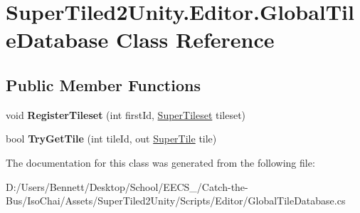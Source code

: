 \hypertarget{class_super_tiled2_unity_1_1_editor_1_1_global_tile_database}{}\section{Super\+Tiled2\+Unity.\+Editor.\+Global\+Tile\+Database Class Reference}
\label{class_super_tiled2_unity_1_1_editor_1_1_global_tile_database}
\subsection*{Public Member Functions}
\begin{DoxyCompactItemize}
\item 
\mbox{\label{class_super_tiled2_unity_1_1_editor_1_1_global_tile_database_a9709cf430d70af54b884610516715e5c}} 
void {\bfseries Register\+Tileset} (int first\+Id, \mbox{\hyperlink{class_super_tiled2_unity_1_1_editor_1_1_super_tileset}{Super\+Tileset}} tileset)
\item 
\mbox{\label{class_super_tiled2_unity_1_1_editor_1_1_global_tile_database_ad4ea11af14e9ca29d8c85dfc56661a48}} 
bool {\bfseries Try\+Get\+Tile} (int tile\+Id, out \mbox{\hyperlink{class_super_tiled2_unity_1_1_super_tile}{Super\+Tile}} tile)
\end{DoxyCompactItemize}


The documentation for this class was generated from the following file\+:\begin{DoxyCompactItemize}
\item 
D\+:/\+Users/\+Bennett/\+Desktop/\+School/\+E\+E\+C\+S\+\_/\+Catch-\/the-\/\+Bus/\+Iso\+Chai/\+Assets/\+Super\+Tiled2\+Unity/\+Scripts/\+Editor/Global\+Tile\+Database.\+cs\end{DoxyCompactItemize}
